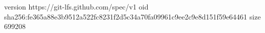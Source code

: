 version https://git-lfs.github.com/spec/v1
oid sha256:fe365a88e3b9512a522fc8231f2d5c34a70fa09961c9ee2c9e8d151f59e64461
size 699208
